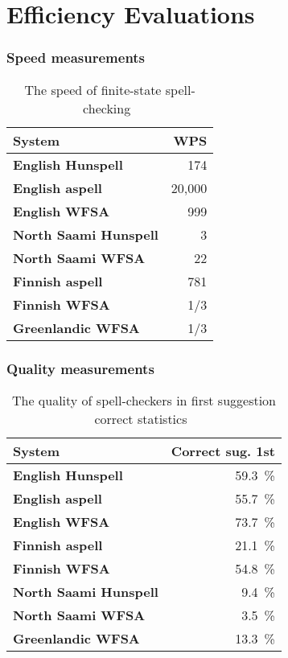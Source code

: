 \documentclass[t,12pt]{beamer}
\begin{document}
\section{Efficiency Evaluations}

\begin{frame}
    \frametitle{Speed measurements}
    \begin{table}
        \centering
        \begin{tabular}{|l|r|}
            \hline
            \bf System & WPS \\
            \hline
            \bf English Hunspell & 174 \\
            \bf English aspell & 20,000 \\
            \bf English WFSA & 999 \\
            \hline
            \bf North Saami Hunspell & 3 \\
                \bf North Saami WFSA & 22 \\
            \hline
            \bf Finnish aspell & 781 \\
              \bf Finnish WFSA & 1/3 \\
            \hline
            \bf Greenlandic WFSA & 1/3 \\
        \end{tabular}
    \caption{The speed of finite-state spell-checking~\cite{pirinen2012effects}}
    \end{table}
\end{frame}

\begin{frame}
    \frametitle{Quality measurements}
    \begin{table}
        \centering
        \begin{tabular}{|l|r|}
            \hline
            \bf System & Correct sug. 1st \\
            \hline
            \bf English Hunspell & 59.3~\%  \\
            \bf English aspell & 55.7~\% \\
            \bf English WFSA & 73.7~\%  \\
            \hline
            \bf Finnish aspell & 21.1~\% \\
            \bf Finnish WFSA & 54.8~\% \\
            \hline
            \bf North Saami Hunspell & 9.4~\%  \\
            \bf North Saami WFSA & 3.5~\% \\
            \hline
            \bf Greenlandic WFSA & 13.3~\% \\
        \end{tabular}
        \caption{The quality of spell-checkers in first suggestion correct
        statistics~\cite{pirinen2013quality}}
    \end{table}
\end{frame}
\end{document}
